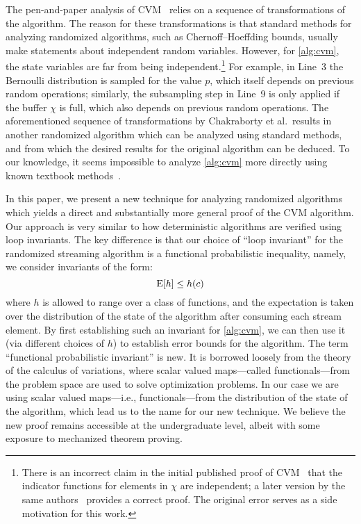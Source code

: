 The pen-and-paper analysis of CVM~\cite{chakraborty2022,chakraborty2023} relies on a sequence of transformations of the algorithm.
The reason for these transformations is that standard methods for analyzing randomized algorithms, such as Chernoff--Hoeffding bounds, usually make statements about independent random variables.
However, for \cref{alg:cvm}, the state variables are far from being independent.\footnote{There is an incorrect claim in the initial published proof of CVM~\cite[Claim 6]{chakraborty2022} that the indicator functions for elements in $\chi$ are independent; a later version by the same authors~\cite{chakraborty2023} provides a correct proof.
The original error serves as a side motivation for this work.}
For example, in Line~3 the Bernoulli distribution is sampled for the value $p$, which itself depends on previous random operations; similarly, the subsampling step in Line~9 is only applied if the buffer $\chi$ is full, which also depends on previous random operations.
The aforementioned sequence of transformations by Chakraborty et al.~results in another randomized algorithm which can be analyzed using standard methods, and from which the desired results for the original algorithm can be deduced.
To our knowledge, it seems impossible to analyze \cref{alg:cvm} more directly using known textbook methods~\cite{alon2000,mitzenmacher2017,motwani1995}.

In this paper, we present a new technique for analyzing randomized algorithms which yields a direct and substantially more general proof of the CVM algorithm.
Our approach is very similar to how deterministic algorithms are verified using loop invariants.
The key difference is that our choice of ``loop invariant'' for the randomized streaming algorithm is a functional probabilistic inequality, namely, we consider invariants of the form:
\[
  \operatorname{\mathrm{E}} [ h ] \leq h(c)
\]
where $h$ is allowed to range over a class of functions, and the expectation is taken over the distribution of the state of the algorithm after consuming each stream element.
By first establishing such an invariant for \cref{alg:cvm}, we can then use it (via different choices of $h$) to establish error bounds for the algorithm.
The term ``functional probabilistic invariant'' is new.
It is borrowed loosely from the theory of the calculus of variations, where scalar valued maps---called functionals---from the problem space are used to solve optimization problems.
In our case we are using scalar valued maps---i.e., functionals---from the distribution of the state of the algorithm, which lead us to the name for our new technique.
We believe the new proof remains accessible at the undergraduate level, albeit with some exposure to mechanized theorem proving.


